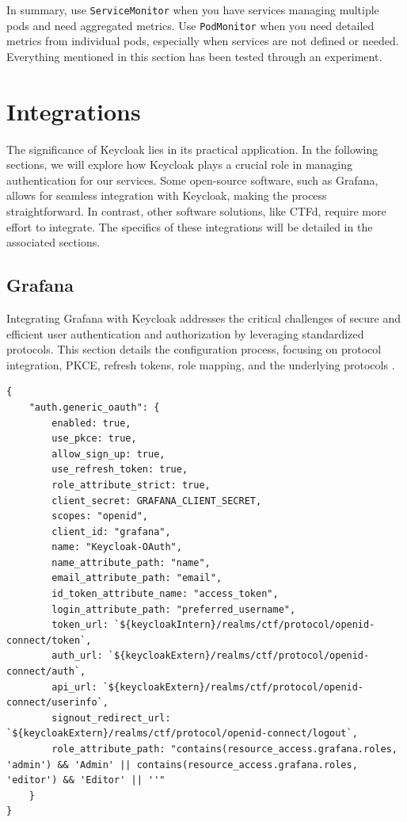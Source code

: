 In summary, use \texttt{ServiceMonitor} when you have services managing multiple pods and need aggregated metrics. Use \texttt{PodMonitor} when you need detailed metrics from individual pods, especially when services are not defined or needed. Everything mentioned in this section has been tested through an experiment.

\section{Integrations}
The significance of Keycloak lies in its practical application. In the following sections, we will explore how Keycloak plays a crucial role in managing authentication for our services. Some open-source software, such as Grafana, allows for seamless integration with Keycloak, making the process straightforward. In contrast, other software solutions, like CTFd, require more effort to integrate. The specifics of these integrations will be detailed in the associated sections.

\subsection{Grafana}\label{sec:grafana_auth}
Integrating Grafana with Keycloak addresses the critical challenges of secure and efficient user authentication and authorization by leveraging standardized protocols. This section details the configuration process, focusing on protocol integration, PKCE, refresh tokens, role mapping, and the underlying protocols \parencite{GrafanaKeycloak}.

\begin{verbatim}
{
    "auth.generic_oauth": {
        enabled: true,
        use_pkce: true,
        allow_sign_up: true,
        use_refresh_token: true,
        role_attribute_strict: true,
        client_secret: GRAFANA_CLIENT_SECRET,
        scopes: "openid",
        client_id: "grafana",
        name: "Keycloak-OAuth",
        name_attribute_path: "name",
        email_attribute_path: "email",
        id_token_attribute_name: "access_token",
        login_attribute_path: "preferred_username",
        token_url: `${keycloakIntern}/realms/ctf/protocol/openid-connect/token`,
        auth_url: `${keycloakExtern}/realms/ctf/protocol/openid-connect/auth`,
        api_url: `${keycloakExtern}/realms/ctf/protocol/openid-connect/userinfo`,
        signout_redirect_url: `${keycloakExtern}/realms/ctf/protocol/openid-connect/logout`,
        role_attribute_path: "contains(resource_access.grafana.roles, 'admin') && 'Admin' || contains(resource_access.grafana.roles, 'editor') && 'Editor' || ''"
    }
}
\end{verbatim}

